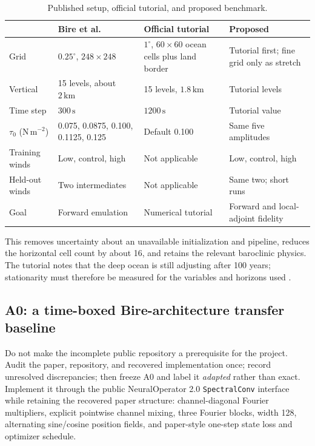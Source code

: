 \documentclass[11pt]{article}
\begin{document}
\begin{table}[htbp]\centering\small
\caption{Published setup, official tutorial, and proposed benchmark.}
\label{tab:benchmarks}
\begin{tabularx}{\textwidth}{@{}p{}YYY@{}}
\toprule
& \textbf{Bire et al.} & \textbf{Official tutorial} & \textbf{Proposed} \\
\midrule
Grid & \(0.25^\circ\), \(248\times248\) & \(1^\circ\), \(60\times60\) ocean cells plus land border & Tutorial first; fine grid only as stretch \\
Vertical & 15 levels, about \(2\,\mathrm{km}\) & 15 levels, \(1.8\,\mathrm{km}\) & Tutorial levels \\
Time step & \(300\,\mathrm{s}\) & \(1200\,\mathrm{s}\) & Tutorial value \\
\(\tau_0\) (\(\mathrm{N\,m^{-2}}\)) & 0.075, 0.0875, 0.100, 0.1125, 0.125 & Default 0.100 & Same five amplitudes \\
Training winds & Low, control, high & Not applicable & Low, control, high \\
Held-out winds & Two intermediates & Not applicable & Same two; short runs \\
Goal & Forward emulation & Numerical tutorial & Forward and local-adjoint fidelity \\
\bottomrule
\end{tabularx}
\end{table}

This removes uncertainty about an unavailable initialization and pipeline, reduces the
horizontal cell count by about 16, and retains the relevant baroclinic physics. The
tutorial notes that the deep ocean is still adjusting after 100 years; stationarity must
therefore be measured for the variables and horizons used \cite{MITgcmTutorial}.

\subsection{A0: a time-boxed Bire-architecture transfer baseline}
Do not make the incomplete public repository a prerequisite for the project. Audit the
paper, repository, and recovered implementation once; record unresolved discrepancies;
then freeze A0 and label it \emph{adapted} rather than exact. Implement it through the
public NeuralOperator 2.0 \texttt{SpectralConv} interface while retaining the recovered
paper structure: channel-diagonal Fourier multipliers, explicit pointwise channel
mixing, three Fourier blocks, width 128, alternating sine/cosine position fields, and
paper-style one-step state loss and optimizer schedule.
\end{document}
